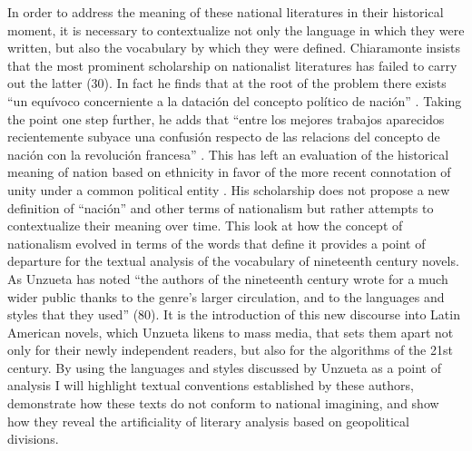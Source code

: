 \documentclass[12pt]{report}
\begin{document}
In order to address the meaning of these national literatures in their historical moment, it is necessary to contextualize not only the language in which they were written, but also the vocabulary by which they were defined. Chiaramonte insists that the most prominent scholarship on nationalist literatures has failed to carry out the latter (30)\nocite{Chiaramonte2004}. 
In fact he finds that at the root of the problem there exists \enquote{un equívoco concerniente a la datación del concepto político de nación} \autocite[32]{Chiaramonte2004}. 
Taking the point one step further, he adds that \enquote{entre los mejores trabajos aparecidos recientemente subyace una confusión respecto de las relacions del concepto de nación con la revolución francesa} \autocite[31]{Chiaramonte2004}. 
This has left an evaluation of the historical meaning of nation based on ethnicity in favor of the more recent connotation of unity under a common political entity \autocite[33]{Chiaramonte2004}. His scholarship does not propose a new definition of \enquote{nación} and other terms of nationalism but rather attempts to contextualize their meaning over time. 
This look at how the concept of nationalism evolved in terms of the words that define it provides a point of departure for the textual analysis of the vocabulary of nineteenth century novels. 
As Unzueta has noted \enquote{the authors of the nineteenth century wrote for a much wider public thanks to the genre's larger circulation, and to the languages and styles that they used} (80)\nocite{Unzueta2002}. 
It is the introduction of this new discourse into Latin American novels, which Unzueta likens to mass media, that sets them apart not only for their newly independent readers, but also for the algorithms of the 21st century. 
By using the languages and styles discussed by Unzueta as a point of analysis I will highlight textual conventions established by these authors, demonstrate how these texts do not conform to national imagining, and show how they reveal the artificiality of literary analysis based on geopolitical divisions.
\end{document}
